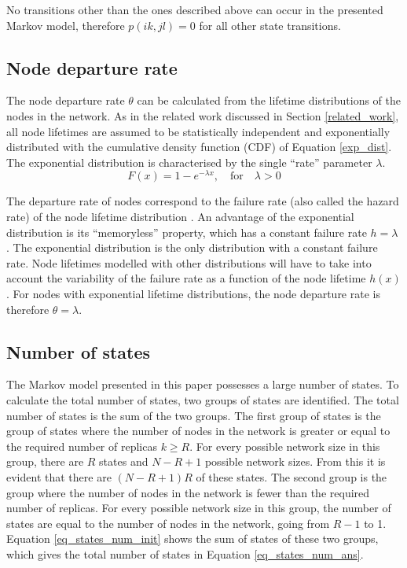 \documentclass[10pt,a4paper,conference]{IEEEtran}
\begin{document}
No transitions other than the ones described above can occur in the presented Markov model, therefore $p(i k,j l) = 0$ for all other state transitions.

\subsection{Node departure rate}

The node departure rate $\theta$ can be calculated from the lifetime distributions of the nodes in the network. As in the related work discussed in Section \ref{related_work}, all node lifetimes are assumed to be statistically independent and exponentially distributed with the cumulative density function (CDF) of Equation \eqref{exp_dist}. The exponential distribution is characterised by the single ``rate'' parameter $\lambda$.
%
\begin{equation} \label{exp_dist}
    F(x) = 1 - e^{-\lambda x},\quad\textrm{for}\quad \lambda > 0
\end{equation}

The departure rate of nodes correspond to the failure rate (also called the hazard rate) of the node lifetime distribution \cite{rausand2004systemreliability}. An advantage of the exponential distribution is its ``memoryless'' property, which has a constant failure rate $h = \lambda$ \cite{rausand2004systemreliability}. The exponential distribution is the only distribution with a constant failure rate. Node lifetimes modelled with other distributions will have to take into account the variability of the failure rate as a function of the node lifetime $h(x)$. For nodes with exponential lifetime distributions, the node departure rate is therefore $\theta = \lambda$.

\subsection{Number of states}

The Markov model presented in this paper possesses a large number of states. To calculate the total number of states, two groups of states are identified. The total number of states is the sum of the two groups. The first group of states is the group of states where the number of nodes in the network is greater or equal to the required number of replicas $k \geq R$. For every possible network size in this group, there are $R$ states and $N - R + 1$ possible network sizes. From this it is evident that there are $(N - R + 1)R$ of these states. The second group is the group where the number of nodes in the network is fewer than the required number of replicas. For every possible network size in this group, the number of states are equal to the number of nodes in the network, going from $R-1$ to 1. Equation \eqref{eq_states_num_init} shows the sum of states of these two groups, which gives the total number of states in Equation \eqref{eq_states_num_ans}.
\end{document}
